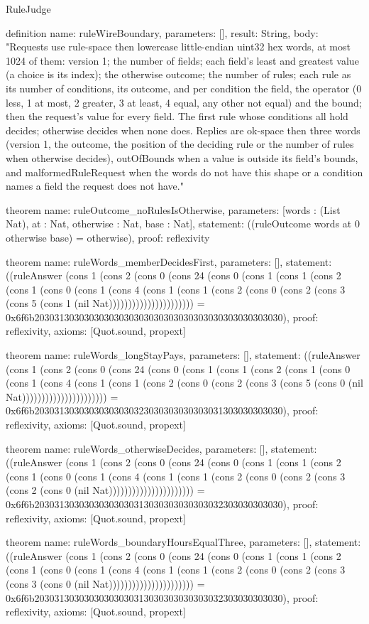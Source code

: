 \begin{lexlean}{RuleJudge}
\begin{semanticmodule}
definition{
  name: ruleWireBoundary,
  parameters: [],
  result: String,
  body: "Requests use rule-space then lowercase little-endian uint32 hex words, at most 1024 of them: version 1; the number of fields; each field's least and greatest value (a choice is its index); the otherwise outcome; the number of rules; each rule as its number of conditions, its outcome, and per condition the field, the operator (0 less, 1 at most, 2 greater, 3 at least, 4 equal, any other not equal) and the bound; then the request's value for every field. The first rule whose conditions all hold decides; otherwise decides when none does. Replies are ok-space then three words (version 1, the outcome, the position of the deciding rule or the number of rules when otherwise decides), outOfBounds when a value is outside its field's bounds, and malformedRuleRequest when the words do not have this shape or a condition names a field the request does not have."
}

theorem{
  name: ruleOutcome_noRulesIsOtherwise,
  parameters: [words : (List Nat), at : Nat, otherwise : Nat, base : Nat],
  statement: ((ruleOutcome words at 0 otherwise base) = otherwise),
  proof: reflexivity{}
}

theorem{
  name: ruleWords_memberDecidesFirst,
  parameters: [],
  statement: ((ruleAnswer (cons 1 (cons 2 (cons 0 (cons 24 (cons 0 (cons 1 (cons 1 (cons 2 (cons 1 (cons 0 (cons 1 (cons 4 (cons 1 (cons 1 (cons 2 (cons 0 (cons 2 (cons 3 (cons 5 (cons 1 (nil Nat)))))))))))))))))))))) = 0x6f6b20303130303030303030303030303030303030303030303030),
  proof: reflexivity{},
  axioms: [Quot.sound, propext]
}

theorem{
  name: ruleWords_longStayPays,
  parameters: [],
  statement: ((ruleAnswer (cons 1 (cons 2 (cons 0 (cons 24 (cons 0 (cons 1 (cons 1 (cons 2 (cons 1 (cons 0 (cons 1 (cons 4 (cons 1 (cons 1 (cons 2 (cons 0 (cons 2 (cons 3 (cons 5 (cons 0 (nil Nat)))))))))))))))))))))) = 0x6f6b20303130303030303030323030303030303031303030303030),
  proof: reflexivity{},
  axioms: [Quot.sound, propext]
}

theorem{
  name: ruleWords_otherwiseDecides,
  parameters: [],
  statement: ((ruleAnswer (cons 1 (cons 2 (cons 0 (cons 24 (cons 0 (cons 1 (cons 1 (cons 2 (cons 1 (cons 0 (cons 1 (cons 4 (cons 1 (cons 1 (cons 2 (cons 0 (cons 2 (cons 3 (cons 2 (cons 0 (nil Nat)))))))))))))))))))))) = 0x6f6b20303130303030303030313030303030303032303030303030),
  proof: reflexivity{},
  axioms: [Quot.sound, propext]
}

theorem{
  name: ruleWords_boundaryHoursEqualThree,
  parameters: [],
  statement: ((ruleAnswer (cons 1 (cons 2 (cons 0 (cons 24 (cons 0 (cons 1 (cons 1 (cons 2 (cons 1 (cons 0 (cons 1 (cons 4 (cons 1 (cons 1 (cons 2 (cons 0 (cons 2 (cons 3 (cons 3 (cons 0 (nil Nat)))))))))))))))))))))) = 0x6f6b20303130303030303030313030303030303032303030303030),
  proof: reflexivity{},
  axioms: [Quot.sound, propext]
}


\end{semanticmodule}
\end{lexlean}
